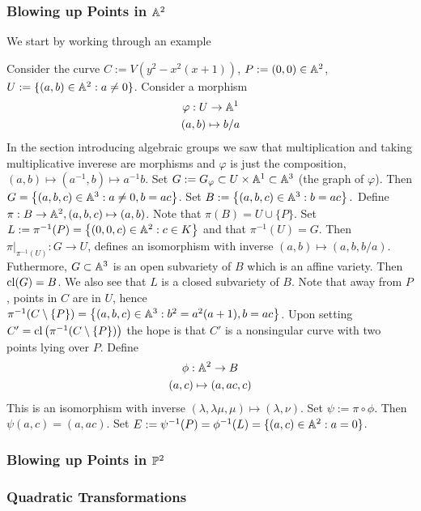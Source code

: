     \subsubsection{Blowing up Points in $\mathbb{A}^2$}
        We start by working through an example
        \begin{example}
            Consider the curve $C:=V(y^2-x^2(x+1))$, $P:=(0,0)\in \mathbb{A}^2$, $U:=\{(a,b)\in \mathbb{A}^2: a\neq 0\}$. Consider a morphism 
            \begin{gather*}
                \varphi: U \rightarrow \mathbb{A}^1\\
                (a,b)\mapsto b/a
            \end{gather*}
            In the section introducing algebraic groups we saw that multiplication and taking multiplicative inverese are morphisms and $\varphi$ is just the composition, $(a,b)\mapsto (a^{-1},b)\mapsto a^{-1}b$. Set $G:=G_\varphi\subset U\times \mathbb{A}^1\subset \mathbb{A}^3$ (the graph of $\varphi$). Then $G=\left\{(a,b,c)\in \mathbb{A}^3 : a\neq 0,b=ac\right\}$. Set $B:=\left\{ (a,b,c)\in \mathbb{A}^3 : b = ac \right\}.$ Define $\pi : B \rightarrow \mathbb{A}^2, (a,b,c)\mapsto (a,b)$. Note that $\pi(B) = U\cup \{P\}$. Set $L:= \pi^{-1}(P) = \left\{(0,0,c)\in \mathbb{A}^2: c\in K\right\}$ and that $\pi^{-1}(U)=G$. Then $\left.\pi\right|_{\pi^{-1}(U)} : G\rightarrow U$, defines an isomorphism with inverse $(a,b)\mapsto (a,b,b/a)$. Futhermore, $G\subset \mathbb{A}^3$ is an open subvariety of $B$ which is an affine variety. Then $\mathrm{cl}(G)=B$. We also see that $L$ is a closed subvariety of $B$. Note that away from $P$, points in $C$ are in $U$, hence $\pi^{-1}(C\setminus \{P\})=\left\{(a,b,c)\in \mathbb{A}^3 : b^2=a^2(a+1), b=ac\right\}$. Upon setting $C' = \mathrm{cl}\left(\pi^{-1}(C\setminus \{P\})\right)$ the hope is that $C'$ is a nonsingular curve with two points lying over $P$. Define 
            \begin{gather*}
                \phi: \mathbb{A}^2 \rightarrow B\\
                (a,c) \mapsto (a,ac,c)
            \end{gather*}
            This is an isomorphism with inverse $(\lambda,\lambda\mu,\mu)\mapsto (\lambda,\nu)$. Set $\psi := \pi \circ \phi$. Then $\psi(a,c)= (a,ac)$. Set $E:=\psi^{-1}(P)=\phi^{-1}(L)=\{(a,c)\in\mathbb{A}^2: a=0\}$. 
        \end{example}
    \subsubsection{Blowing up Points in $\mathbb{P}^2$}
    \subsubsection{Quadratic Transformations}

